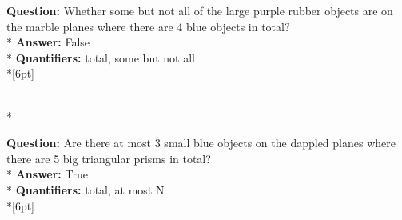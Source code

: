 \begin{figure*}
\begin{minipage}{0.48\textwidth}
\begin{minipage}[t][2.2cm][t]{1\textwidth}
      \footnotesize
      \textbf{Question:} Whether some but not all of the large purple rubber objects are on the marble planes where there are 4 blue objects in total? \\*
      \textbf{Answer:} False \\*
      \textbf{Quantifiers:} total, some but not all  \\*[6pt]
    \end{minipage}\\*
    \begin{minipage}[t][2.2cm][t]{1\textwidth}
      \footnotesize
      \textbf{Question:} Are there at most 3 small blue objects on the dappled planes where there are 5 big triangular prisms in total? \\*
      \textbf{Answer:} True \\*
      \textbf{Quantifiers:} total, at most N \\*[6pt]
    \end{minipage}
  \end{minipage}
  \vspace{0.2cm}
  

\end{figure*}
